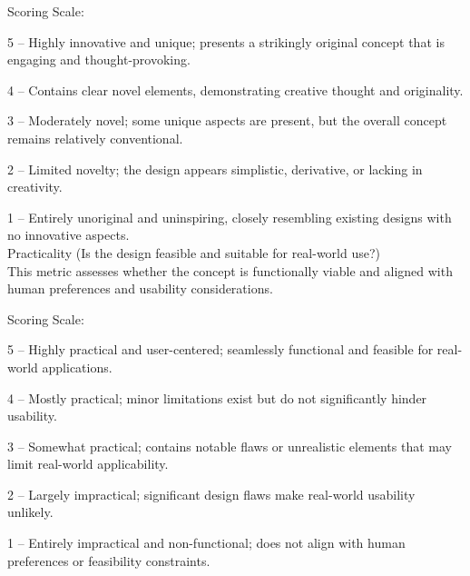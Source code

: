 \begin{tcolorbox}[colback=gray!10, colframe=black, title=Human Evaluation Instruction]
Scoring Scale:



5 – Highly innovative and unique; presents a strikingly original concept that is engaging and thought-provoking.

4 – Contains clear novel elements, demonstrating creative thought and originality.

3 – Moderately novel; some unique aspects are present, but the overall concept remains relatively conventional.

2 – Limited novelty; the design appears simplistic, derivative, or lacking in creativity.

1 – Entirely unoriginal and uninspiring, closely resembling existing designs with no innovative aspects. \\



Practicality (Is the design feasible and suitable for real-world use?) \\
This metric assesses whether the concept is functionally viable and aligned with human preferences and usability considerations.


Scoring Scale:



5 – Highly practical and user-centered; seamlessly functional and feasible for real-world applications.

4 – Mostly practical; minor limitations exist but do not significantly hinder usability.

3 – Somewhat practical; contains notable flaws or unrealistic elements that may limit real-world applicability.

2 – Largely impractical; significant design flaws make real-world usability unlikely.

1 – Entirely impractical and non-functional; does not align with human preferences or feasibility constraints.

\end{tcolorbox}

